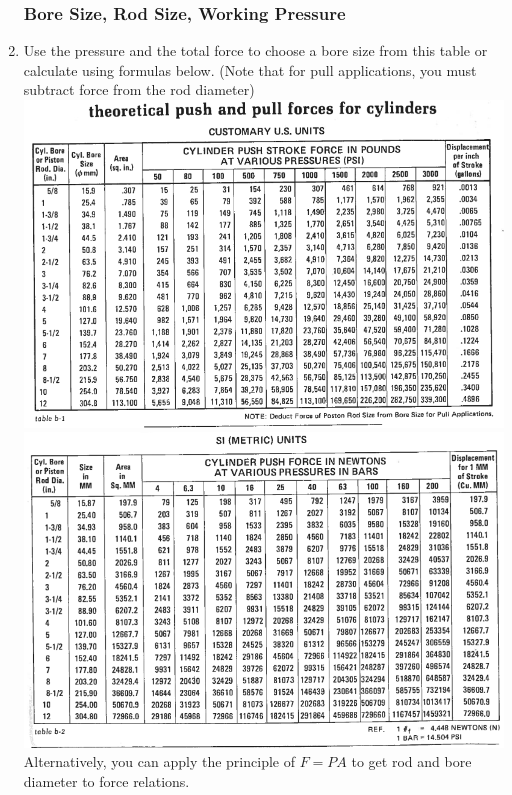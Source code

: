 \documentclass[11pt, fleqn]{article}
\begin{document}
\begin{enumerate}
    \subsubsection{Bore Size, Rod Size, Working Pressure} \label{regen}
    \item Use the pressure and the total force to choose a bore size from this table or calculate using formulas below. (Note that for pull applications, you must subtract force from the rod diameter)\\
    \includegraphics[scale=1]{Fluids/tabB1.png}\\
    \includegraphics[scale=1]{Fluids/tabB2.png}\\
    
    Alternatively, you can apply the principle of $F=PA$ to get rod and bore diameter to force relations.


\end{enumerate}
\end{document}
